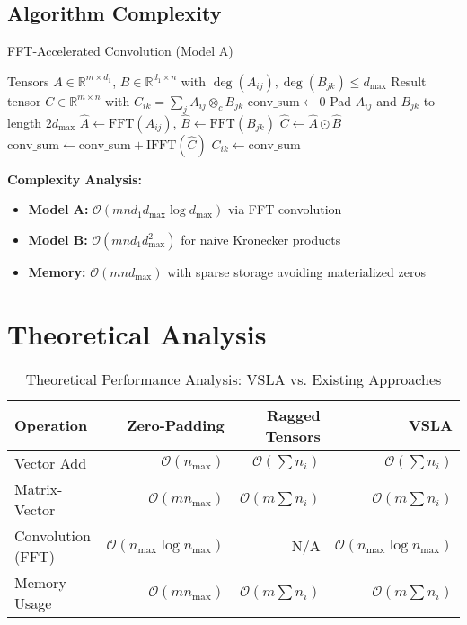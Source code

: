 \documentclass[11pt]{article}
\begin{document}
\subsection{Algorithm Complexity}

\begin{algorithm}
\caption{FFT-Accelerated Convolution (Model A)}
\begin{algorithmic}[1]
\REQUIRE Tensors $A \in \mathbb{R}^{m \times d_1}$, $B \in \mathbb{R}^{d_1 \times n}$ with $\deg(A_{ij}), \deg(B_{jk}) \leq d_{\max}$
\ENSURE Result tensor $C \in \mathbb{R}^{m \times n}$ with $C_{ik} = \sum_j A_{ij} \otimes_c B_{jk}$
        \STATE $\text{conv\_sum} \leftarrow 0$
            \STATE Pad $A_{ij}$ and $B_{jk}$ to length $2d_{\max}$
            \STATE $\hat{A} \leftarrow \text{FFT}(A_{ij})$, $\hat{B} \leftarrow \text{FFT}(B_{jk})$ 
            \STATE $\hat{C} \leftarrow \hat{A} \odot \hat{B}$ 
            \STATE $\text{conv\_sum} \leftarrow \text{conv\_sum} + \text{IFFT}(\hat{C})$
        \ENDFOR
        \STATE $C_{ik} \leftarrow \text{conv\_sum}$
    \ENDFOR
\ENDFOR
\end{algorithmic}
\end{algorithm}

\textbf{Complexity Analysis:} 
\begin{itemize}[leftmargin=1.5em]
\item \textbf{Model A:} $\mathcal{O}(mn d_1 d_{\max} \log d_{\max})$ via FFT convolution
\item \textbf{Model B:} $\mathcal{O}(mn d_1 d_{\max}^2)$ for naive Kronecker products  
\item \textbf{Memory:} $\mathcal{O}(mn d_{\max})$ with sparse storage avoiding materialized zeros
\end{itemize}

\section{Theoretical Analysis}
\label{sec:evaluation}

\begin{table}[h]
\centering
\caption{Theoretical Performance Analysis: VSLA vs. Existing Approaches}
\begin{tabular}{lrrr}
\toprule
\textbf{Operation} & \textbf{Zero-Padding} & \textbf{Ragged Tensors} & \textbf{VSLA} \\
\midrule
Vector Add & $\mathcal{O}(n_{\max})$ & $\mathcal{O}(\sum n_i)$ & $\mathcal{O}(\sum n_i)$ \\
Matrix-Vector & $\mathcal{O}(mn_{\max})$ & $\mathcal{O}(m\sum n_i)$ & $\mathcal{O}(m\sum n_i)$ \\
Convolution (FFT) & $\mathcal{O}(n_{\max} \log n_{\max})$ & N/A & $\mathcal{O}(n_{\max} \log n_{\max})$ \\
Memory Usage & $\mathcal{O}(mn_{\max})$ & $\mathcal{O}(m\sum n_i)$ & $\mathcal{O}(m\sum n_i)$ \\
\bottomrule
\end{tabular}
\end{table}
\end{document}
